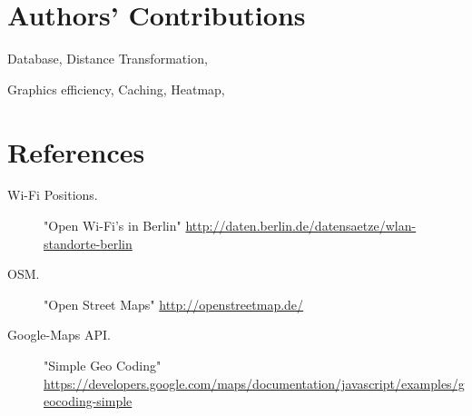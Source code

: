 \section*{Authors' Contributions}

\begin{description}
\setlength{\itemsep}{0pt}
  \item[Andreas Ergenzinger] Database, Distance Transformation,
  \item[Josua Krause] Graphics efficiency, Caching, Heatmap,
\end{description}

\section*{References}

\begin{description}
\item[Wi-Fi Positions.] "Open Wi-Fi's in Berlin" 
  \url{http://daten.berlin.de/datensaetze/wlan-standorte-berlin}
\item[OSM.] "Open Street Maps" 
  \url{http://openstreetmap.de/}
\item[Google-Maps API.] "Simple Geo Coding"
  \url{https://developers.google.com/maps/documentation/javascript/examples/geocoding-simple} 
\end{description}
